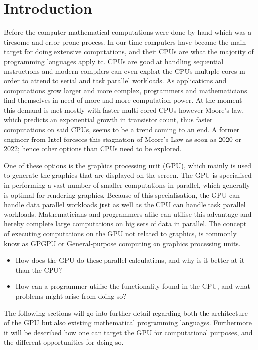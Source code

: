 \chapter{Introduction} %
\label{cha:introduction}
Before the computer mathematical computations were done by hand which was a tiresome and error-prone process.
In our time computers have become the main target for doing extensive computations, and their CPUs are what the majority of programming languages apply to.
CPUs are good at handling sequential instructions and modern compilers can even exploit the CPUs multiple cores in order to attend to serial and task parallel workloads.
As applications and computations grow larger and more complex, programmers and mathematicians find themselves in need of more and more computation power.\citep[pp. 4]{OpenCL_AMD}
At the moment this demand is met mostly with faster multi-cored CPUs however Moore's law, which predicts an exponential growth in transistor count, thus faster computations on said CPUs, seems to be a trend coming to an end.
A former engineer from Intel foresees this stagnation of Moore's Law as soon as 2020 or 2022; hence other options than CPUs need to be explored. \citep{Moore2013}

One of these options is the graphics processing unit (GPU), which mainly is used to generate the graphics that are displayed on the screen.
The GPU is specialised in performing a vast number of smaller computations in parallel, which generally is optimal for rendering graphics.
Because of this specialisation, the GPU can handle data parallel workloads just as well as the CPU can handle task parallel workloads.
Mathematicians and programmers alike can utilise this advantage and hereby complete large computations on big sets of data in parallel.
The concept of executing computations on the GPU not related to graphics, is commonly know as GPGPU or General-purpose computing on graphics processing units.

\begin{itemize}
	\item How does the GPU do these parallel calculations, and why is it better at it than the CPU?
	\item How can a programmer utilise the functionality found in the GPU, and what problems might arise from doing so? 
\end{itemize}

The following sections will go into further detail regarding both the architecture of the GPU but also existing mathematical programming languages.
Furthermore it will be described how one can target the GPU for computational purposes, and the different opportunities for doing so. 

\newpage
